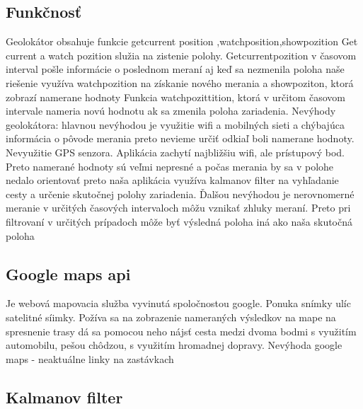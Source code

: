\subsection{Funkčnosť}

Geolokátor obsahuje funkcie getcurrent position ,watchposition,showpozition
Get current a watch pozition služia na zistenie polohy.
Getcurrentpozition v časovom interval pošle informácie o poslednom meraní aj keď sa
nezmenila poloha naše riešenie využíva watchpozition na získanie nového merania
a showpoziton, ktorá zobrazí namerane hodnoty
Funkcia watchpozittition, ktorá v určitom časovom intervale nameria novú hodnotu ak sa
zmenila poloha zariadenia.
Nevýhody geolokátora: hlavnou nevýhodou je využitie wifi a mobilných sieti a chýbajúca
informácia o pôvode merania preto nevieme určiť odkiaľ boli namerane hodnoty. Nevyužitie
GPS senzora. Aplikácia zachytí najbližšiu wifi, ale prístupový bod. Preto namerané hodnoty
sú veľmi nepresné a počas merania by sa v polohe nedalo orientovať preto naša aplikácia
využíva kalmanov filter na vyhľadanie cesty a určenie skutočnej polohy zariadenia. Ďalšou
nevýhodou je nerovnomerné meranie v určitých časových intervaloch môžu vznikať zhluky
meraní. Preto pri filtrovaní v určitých prípadoch môže byť výsledná poloha iná ako naša
skutočná poloha 

\subsection{Google maps api }

Je webová mapovacia služba vyvinutá spoločnostou google. Ponuka snímky ulíc satelitné
síimky. Požíva sa na zobrazenie nameraných výsledkov na mape na spresnenie trasy dá sa
pomocou neho nájsť cesta medzi dvoma bodmi s využitím automobilu, pešou chôdzou,
s využitím hromadnej dopravy. Nevýhoda google maps - neaktuálne linky na zastávkach

\subsection{Kalmanov filter }


